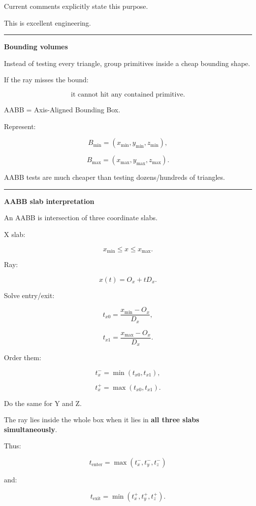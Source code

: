 Current comments explicitly state this purpose.

This is excellent engineering.

\begin{center}\rule{0.5\linewidth}{0.5pt}\end{center}

\textbf{Bounding volumes}

Instead of testing every triangle, group primitives inside a cheap bounding shape.

If the ray misses the bound:

\[
\boxed{
\text{it cannot hit any contained primitive}.
}
\]

AABB = Axis-Aligned Bounding Box.

Represent:

\[
B_{\min}
=
(x_{\min},y_{\min},z_{\min}),
\]

\[
B_{\max}
=
(x_{\max},y_{\max},z_{\max}).
\]

AABB tests are much cheaper than testing dozens/hundreds of triangles.

\begin{center}\rule{0.5\linewidth}{0.5pt}\end{center}

\textbf{AABB slab interpretation}

An AABB is intersection of three coordinate slabs.

X slab:

\[
x_{\min}\le x\le x_{\max}.
\]

Ray:

\[
x(t)=O_x+tD_x.
\]

Solve entry/exit:

\[
t_{x0}
=
\frac{x_{\min}-O_x}{D_x},
\]

\[
t_{x1}
=
\frac{x_{\max}-O_x}{D_x}.
\]

Order them:

\[
t_x^-=\min(t_{x0},t_{x1}),
\]

\[
t_x^+=\max(t_{x0},t_{x1}).
\]

Do the same for Y and Z.

The ray lies inside the whole box when it lies in \textbf{all three slabs simultaneously}.

Thus:

\[
\boxed{
t_{\text{enter}}
=
\max(
t_x^-,
t_y^-,
t_z^-
)
}
\]

and:

\[
\boxed{
t_{\text{exit}}
=
\min(
t_x^+,
t_y^+,
t_z^+
).
}
\]

